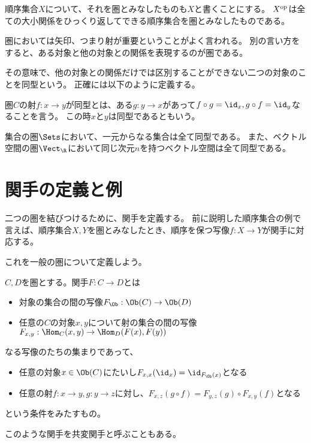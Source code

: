 \documentclass[uplatex]{jsarticle}
\begin{document}
\begin{eg}
順序集合$X$について、それを圏とみなしたものも$X$と書くことにする。
$X^{\rm op}$は全ての大小関係をひっくり返してできる順序集合を圏とみなしたものである。
\end{eg}

圏においては矢印、つまり射が重要ということがよく言われる。
別の言い方をすると、ある対象と他の対象との関係を表現するのが圏である。

その意味で、他の対象との関係だけでは区別することができない二つの対象のことを同型という。
正確には以下のように定義する。

\begin{dfn}
圏$C$の射$f:x\to y$が同型とは、ある$g:y\to x$があって$f\circ g=\id_x, g\circ f=\id_y$なることを言う。
この時$x$と$y$は同型であるともいう。
\end{dfn}

\begin{eg}
集合の圏$\Sets$において、一元からなる集合は全て同型である。
また、ベクトル空間の圏$\Vect_\R$において同じ次元$n$を持つベクトル空間は全て同型である。
\end{eg}

\section{関手の定義と例}
二つの圏を結びつけるために、関手を定義する。
前に説明した順序集合の例で言えば、順序集合$X, Y$を圏とみなしたとき、順序を保つ写像$f:X \to Y$が関手に対応する。

これを一般の圏について定義しよう。

\begin{dfn}[関手]
$C, D$を圏とする。関手$F:C\to D$とは
\begin{itemize}
\item 対象の集合の間の写像$F_{\Ob}:\Ob(C)\to \Ob(D)$
\item 任意の$C$の対象$x,y$について射の集合の間の写像$F_{x,y}:\Hom_C(x,y)\to \Hom_D(F(x),F(y))$
\end{itemize}
なる写像のたちの集まりであって、
\begin{itemize}
\item 任意の対象$x\in\Ob(C)$にたいし$F_{x,x}(\id_x)=\id_{F_{\Ob}(x)}$となる
\item 任意の射$f:x\to y, g:y\to z$に対し、$F_{x,z}(g\circ f)=F_{y,z}(g)\circ F_{x,y}(f)$となる
\end{itemize}
という条件をみたすもの。
\end{dfn}

このような関手を共変関手と呼ぶこともある。
\end{document}
